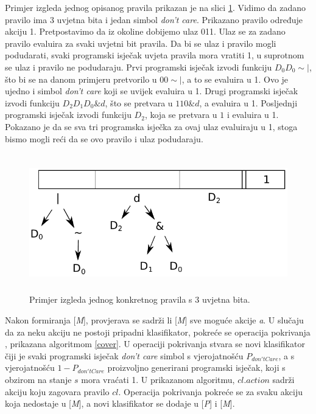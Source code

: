 \documentclass[times, utf8, zavrsni]{fer}
\begin{document}
Primjer izgleda jednog opisanog pravila prikazan je na slici \ref{img:clex}.
Vidimo da zadano pravilo ima 3 uvjetna bita i jedan simbol \emph{don't care}.
Prikazano pravilo određuje akciju 1.
Pretpostavimo da iz okoline dobijemo ulaz 011.
Ulaz se za zadano pravilo evaluira za svaki uvjetni bit pravila.
Da bi se ulaz i pravilo mogli podudarati, svaki programski isječak uvjeta pravila mora vratiti 1, u suprotnom se ulaz i pravilo ne podudaraju.
Prvi programski isječak izvodi funkciju $D_{0}D_{0}\sim|$, što bi se na danom primjeru pretvorilo u $00\sim|$, a to se evaluira u 1.
Ovo je ujedno i simbol \emph{don't care} koji se uvijek evaluira u 1.
Drugi programski isječak izvodi funkciju $D_{2}D_{1}D_{0}\&d$, što se pretvara u $110\&d$, a evaluira u 1.
Posljednji programski isječak izvodi funkciju $D_{2}$, koja se pretvara u $1$ i evaluira u 1.
Pokazano je da se sva tri programska isječka za ovaj ulaz evaluiraju u 1, stoga bismo mogli reći da se ovo pravilo i ulaz podudaraju.
\begin{figure}[h]
    \centering
    \includegraphics[height=6cm]{img/clex.pdf}
    \caption{Primjer izgleda jednog konkretnog pravila s 3 uvjetna bita.}
    \label{img:clex}
\end{figure}

Nakon formiranja [\emph{M}], provjerava se sadrži li [\emph{M}] sve moguće akcije \emph{a}.
U slučaju da za neku akciju ne postoji pripadni klasifikator, pokreće se operacija pokrivanja , prikazana algoritmom \ref{cover}.
U operaciji pokrivanja stvara se novi klasifikator čiji je svaki programski isječak \emph{don't care} simbol s vjerojatnošću $P_{don'tCare}$, a s vjerojatnošću $1 - P_{don'tCare}$ proizvoljno generirani programski isječak, koji s obzirom na stanje $s$ mora vraćati 1.
U prikazanom algoritmu, $cl.action$ sadrži akciju koju zagovara pravilo $cl$.
Operacija pokrivanja pokreće se za svaku akciju koja nedostaje u [\emph{M}], a novi klasifikator se dodaje u [\emph{P}] i [\emph{M}].
\end{document}
